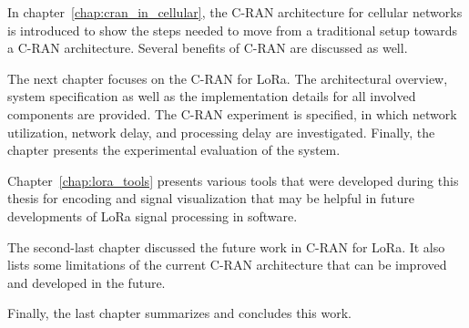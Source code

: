 In chapter~\ref{chap:cran_in_cellular}, the C-RAN architecture for cellular networks is introduced to show the steps needed to move from a traditional setup towards a C-RAN architecture.
Several benefits of C-RAN are discussed as well.

The next chapter focuses on the C-RAN for LoRa. 
The architectural overview, system specification as well as the implementation details for all involved components are provided. 
The C-RAN experiment is specified, in which network utilization, network delay, and processing delay are investigated.
Finally, the chapter presents the experimental evaluation of the system.

Chapter~\ref{chap:lora_tools} presents various tools that were developed during this thesis for encoding and signal visualization that may be helpful in future developments of LoRa signal processing in software.

The second-last chapter discussed the future work in C-RAN for LoRa. It also lists some limitations of the current C-RAN architecture that can be improved and developed in the future.

Finally, the last chapter summarizes and concludes this work.


